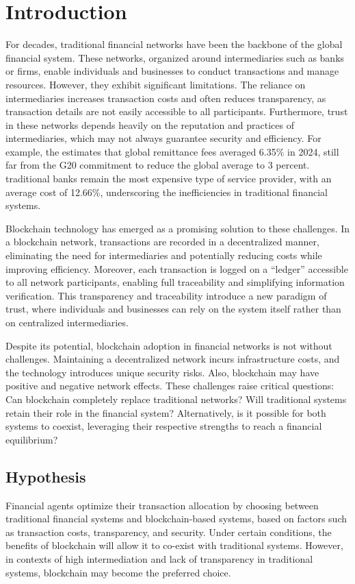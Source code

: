 
\chapter{Introduction}\label{chapter:Intro} %
For decades, traditional financial networks have been the backbone of the global financial system. These networks, organized around intermediaries such as banks or firms, enable individuals and businesses to conduct transactions and manage resources. However, they exhibit significant limitations. The reliance on intermediaries increases transaction costs and often reduces transparency, as transaction details are not easily accessible to all participants. Furthermore, trust in these networks depends heavily on the reputation and practices of intermediaries, which may not always guarantee security and efficiency. For example, the  estimates that global remittance fees averaged 6.35\% in 2024, still far from the G20 commitment to reduce the global average to 3 percent. traditional banks remain the most expensive type of service provider, with an average cost of 12.66\%, underscoring the inefficiencies in traditional financial systems.

Blockchain technology has emerged as a promising solution to these challenges. In a blockchain network, transactions are recorded in a decentralized manner, eliminating the need for intermediaries and potentially reducing costs while improving efficiency. Moreover, each transaction is logged on a “ledger” accessible to all network participants, enabling full traceability and simplifying information verification. This transparency and traceability introduce a new paradigm of trust, where individuals and businesses can rely on the system itself rather than on centralized intermediaries.

Despite its potential, blockchain adoption in financial networks is not without challenges. Maintaining a decentralized network incurs infrastructure costs, and the technology introduces unique security risks. Also, blockchain may have positive and negative network effects. These challenges raise critical questions: Can blockchain completely replace traditional networks? Will traditional systems retain their role in the financial system? Alternatively, is it possible for both systems to coexist, leveraging their respective strengths to reach a financial equilibrium?


\section{Hypothesis}
Financial agents optimize their transaction allocation by choosing between traditional financial systems and blockchain-based systems, based on factors such as transaction costs, transparency, and security. Under certain conditions, the benefits of blockchain will allow it to co-exist with traditional systems. However, in contexts of high intermediation and lack of transparency in traditional systems, blockchain may become the preferred choice.


